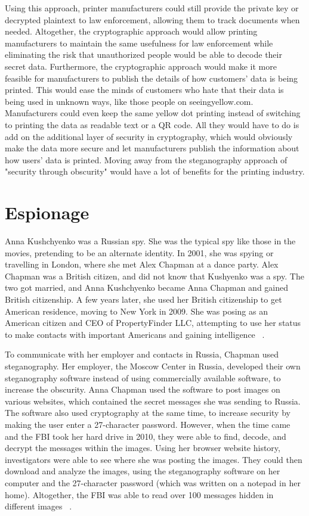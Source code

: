 	Using this approach, printer manufacturers could still provide the private key or decrypted plaintext to law enforcement, allowing them to track documents when needed. Altogether, the cryptographic approach would allow printing manufacturers to maintain the same usefulness for law enforcement while eliminating the risk that unauthorized people would be able to decode their secret data. Furthermore, the cryptographic approach would make it more feasible for manufacturers to publish the details of how customers' data is being printed. This would ease the minds of customers who hate that their data is being used in unknown ways, like those people on seeingyellow.com. Manufacturers could even keep the same yellow dot printing instead of switching to printing the data as readable text or a QR code. All they would have to do is add on the additional layer of security in cryptography, which would obviously make the data more secure and let manufacturers publish the information about how users' data is printed. Moving away from the steganography approach of "security through obscurity" would have a lot of benefits for the printing industry.

\section{Espionage}

	Anna Kushchyenko was a Russian spy. She was the typical spy like those in the movies, pretending to be an alternate identity. In 2001, she was spying or travelling in London, where she met Alex Chapman at a dance party. Alex Chapman was a British citizen, and did not know that Kushyenko was a spy. The two got married, and Anna Kushchyenko became Anna Chapman and gained British citizenship. A few years later, she used her British citizenship to get American residence, moving to New York in 2009. She was posing as an American citizen and CEO of PropertyFinder LLC, attempting to use her status to make contacts with important Americans and gaining intelligence ~\cite{dt}.
	
	To communicate with her employer and contacts in Russia, Chapman used steganography. Her employer, the Moscow Center in Russia, developed their own steganography software instead of using commercially available software, to increase the obscurity. Anna Chapman used the software to post images on various websites, which contained the secret messages she was sending to Russia. The software also used cryptography at the same time, to increase security by making the user enter a 27-character password. However, when the time came and the FBI took her hard drive in 2010, they were able to find, decode, and decrypt the messages within the images. Using her browser website history, investigators were able to see where she was posting the images. They could then download and analyze the images, using the steganography software on her computer and the 27-character password (which was written on a notepad in her home). Altogether, the FBI was able to read over 100 messages hidden in different images ~\cite{doc}.

